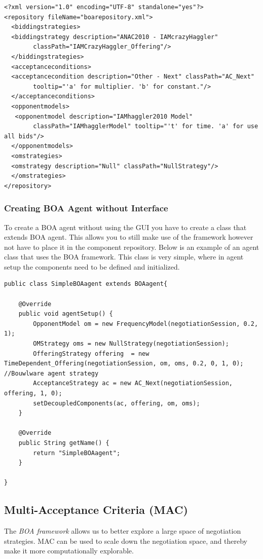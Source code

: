 \documentclass[]{article}
\begin{document}
\begin{lstlisting}
<?xml version="1.0" encoding="UTF-8" standalone="yes"?>
<repository fileName="boarepository.xml">
  <biddingstrategies>
  <biddingstrategy description="ANAC2010 - IAMcrazyHaggler" 
		classPath="IAMCrazyHaggler_Offering"/>
  </biddingstrategies>
  <acceptanceconditions>
  <acceptancecondition description="Other - Next" classPath="AC_Next" 
		tooltip="'a' for multiplier. 'b' for constant."/>		
  </acceptanceconditions>
  <opponentmodels>
   <opponentmodel description="IAMhaggler2010 Model" 
		classPath="IAMhagglerModel" tooltip="'t' for time. 'a' for use all bids"/>
  </opponentmodels>
  <omstrategies>
  <omstrategy description="Null" classPath="NullStrategy"/>
  </omstrategies>
</repository>
\end{lstlisting}

\subsubsection{Creating BOA Agent without Interface}
To create a BOA agent without using the GUI you have to create a class that extends BOA agent.  This allows you to still make use of the framework however not have to place it in the component repository.  Below is an example of an agent class that uses the BOA framework.  This class is very simple, where in agent setup the components need to be defined and initialized.

\begin{lstlisting}
public class SimpleBOAagent extends BOAagent{

	@Override
	public void agentSetup() {
		OpponentModel om = new FrequencyModel(negotiationSession, 0.2, 1);
		OMStrategy oms = new NullStrategy(negotiationSession);
		OfferingStrategy offering  = new TimeDependent_Offering(negotiationSession, om, oms, 0.2, 0, 1, 0); //Bouwlware agent strategy
		AcceptanceStrategy ac = new AC_Next(negotiationSession, offering, 1, 0);
		setDecoupledComponents(ac, offering, om, oms);		
	}

	@Override
	public String getName() {
		return "SimpleBOAagent";
	}

}
\end{lstlisting}

\subsection{Multi-Acceptance Criteria (MAC)}
The \textit{BOA framework} allows us to better explore a large space of negotiation strategies. MAC can be used to scale down the negotiation space, and thereby make it more computationally explorable.
\end{document}
